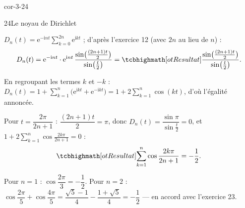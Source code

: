 \begin{blocLivre}{cor-3-24}
\begin{corrige}{24}{Le noyau de Dirichlet}
\begin{questions}
  \item $D_n(t)=\mathrm{e}^{-\mathrm{i}nt}\displaystyle\sum_{k=0}^{2n}\mathrm{e}^{\mathrm{i}kt}$ ;
    d'après l'exercice 12 (avec $2n$ au lieu de $n$) :
    \[
      D_n(t)=\mathrm{e}^{-\mathrm{i}nt}\cdot\mathrm{e}^{\mathrm{i}nt}\,
      \frac{\sin\bigl(\frac{(2n+1)t}{2}\bigr)}{\sin\bigl(\frac{t}{2}\bigr)}
      =\res{\frac{\sin\bigl(\frac{(2n+1)t}{2}\bigr)}{\sin\bigl(\frac{t}{2}\bigr)}}.
    \]
  \item En regroupant les termes $k$ et $-k$ :
    $D_n(t)=1+\displaystyle\sum_{k=1}^{n}\bigl(\mathrm{e}^{\mathrm{i}kt}+\mathrm{e}^{-\mathrm{i}kt}\bigr)
    =1+2\sum_{k=1}^{n}\cos(kt)$, d'où l'égalité annoncée.
  \item Pour $t=\dfrac{2\pi}{2n+1}$ : $\dfrac{(2n+1)t}{2}=\pi$, donc
    $D_n(t)=\dfrac{\sin\pi}{\sin\frac{t}{2}}=0$, et
    $1+2\displaystyle\sum_{k=1}^{n}\cos\frac{2k\pi}{2n+1}=0$ :
    \[
      \res{\sum_{k=1}^{n}\cos\frac{2k\pi}{2n+1}=-\frac12}.
    \]
  \item Pour $n=1$ : $\cos\dfrac{2\pi}{3}=-\dfrac12$. Pour $n=2$ :
    $\cos\dfrac{2\pi}{5}+\cos\dfrac{4\pi}{5}
    =\dfrac{\sqrt5-1}{4}-\dfrac{1+\sqrt5}{4}=-\dfrac12$ — en accord avec
    l'exercice 23.
\end{questions}
\end{corrige}
\end{blocLivre}


